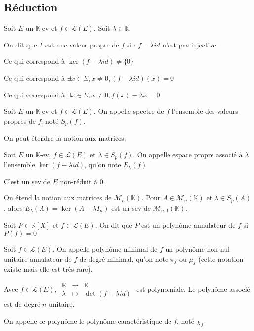 \documentclass[a4paper,12pt]{book}
\newcommand{\Def}[2]{\begin{tcolorbox}[colback=white,colframe=red!10!green!20!blue!75!, title=Définition : #1]#2\end{tcolorbox}}
\def\K{\mathbb{K}}
\begin{document}
\subsection{Réduction}
\Def{Valeur propre}{Soit $E$ un $\K$-ev et $f\in\mathcal{L}(E)$. Soit $\lambda \in\K$. \par On dit que $\lambda$ est une valeur propre de $f$ si : $f-\lambda id$ n'est pas injective. \par Ce qui correspond à $\ker (f-\lambda id)\neq\{0\}$ \par Ce qui correspond à $\exists x\in E, x\neq 0, (f-\lambda id)(x)=0$ \par Ce qui correspond à $\exists x\in E,x\neq 0, f(x)-\lambda x=0$}
\Def{Spectre d'un endomorphisme}{Soit $E$ un $\K$-ev et $f\in \mathcal{L}(E)$. On appelle spectre de $f$ l'ensemble des valeurs propres de $f$, noté $S_p(f)$. \par On peut étendre la notion aux matrices.}
\Def{Espace propre}{Soit $E$ un $\K$-ev, $f\in\mathcal{L}(E)$ et $\lambda\in S_p(f)$. On appelle espace propre associé à $\lambda$ l'ensemble $\ker (f-\lambda id)$, qu'on note $E_\lambda(f)$ \par C'est un sev de $E$ non-réduit à $0$. \par On étend la notion aux matrices de $\mathcal{M}_n(\K)$. Pour $A\in\mathcal{M}_n(\K)$ et $\lambda\in S_p(A)$, alors $E_\lambda(A) = \ker (A-\lambda I_n)$ est un sev de $\mathcal{M}_{n,1}(\K)$.}
\Def{Polynôme annulateur}{Soit $P\in\K[X]$ et $f\in\mathcal{L}(E)$. On dit que $P$ est un polynôme annulateur de $f$ si $P(f)=0$}
\Def{Polynôme minimal}{Soit $f\in\mathcal{L}(E)$. On appelle polynôme minimal de $f$ un polynôme non-nul unitaire annulateur de $f$ de degré minimal, qu'on note $\pi_f$ ou $\mu_f$ (cette notation existe mais elle est très rare).}
\Def{Polynôme caractéristique}{Avec $f\in\mathcal{L}(E)$, $\begin{array}{rcl} \K & \to & \K \\ \lambda & \mapsto & \det (f-\lambda id)\end{array}$ est polynomiale. Le polynôme associé est de degré $n$ unitaire.
\par On appelle ce polynôme le polynôme caractéristique de $f$, noté $\chi_f$}
\end{document}
